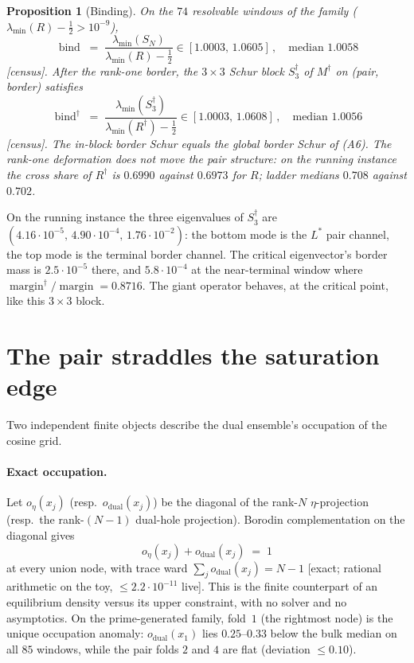 \documentclass[11pt]{article}
\newtheorem{prop}{Proposition}
\theoremstyle{remark}
\newcommand{\Rd}{R^{\dagger}}
\newcommand{\Ls}{L^{*}}
\newcommand{\half}{\tfrac12}
\newcommand{\gr}[1]{\textnormal{\small[#1]}}
\begin{document}
\begin{prop}[Binding]\label{prop:block}
On the $74$ resolvable windows of the family
($\lambda_{\min}(R)-\half>10^{-9}$),
\[
\operatorname{bind}
\;=\;
\frac{\lambda_{\min}(S_{N})}{\lambda_{\min}(R)-\half}
\in[1.0003,\,1.0605]\,,
\quad\text{median }1.0058
\]
\gr{census}.  After the rank-one border, the $3\times3$ Schur block
$S^{\dagger}_{3}$ of $M^{\dagger}$ on (pair, border) satisfies
\[
\operatorname{bind}^{\dagger}
\;=\;
\frac{\lambda_{\min}(S^{\dagger}_{3})}{\lambda_{\min}(\Rd)-\half}
\in[1.0003,\,1.0608]\,,
\quad\text{median }1.0056
\]
\gr{census}.  The in-block border Schur equals the global border
Schur of \textup{(A6)}.  The rank-one deformation does not move the
pair structure: on the running instance the cross share of $\Rd$ is
$0.6990$ against $0.6973$ for $R$; ladder medians $0.708$ against
$0.702$.
\end{prop}

On the running instance the three eigenvalues of $S^{\dagger}_{3}$ are
$(4.16\cdot10^{-5},\,4.90\cdot10^{-4},\,1.76\cdot10^{-2})$: the bottom
mode is the $\Ls$ pair channel, the top mode is the terminal border
channel.  The critical eigenvector's border mass is
$2.5\cdot10^{-5}$ there, and $5.8\cdot10^{-4}$ at the
near-terminal window where
$\operatorname{margin}^{\dagger}/\operatorname{margin}=0.8716$.
The giant operator behaves, at the critical point, like this
$3\times3$ block.

\section{The pair straddles the saturation edge}\label{sec:edge}

Two independent finite objects describe the dual ensemble's occupation
of the cosine grid.

\paragraph{Exact occupation.}
Let $o_{\eta}(x_{j})$ (resp.\ $o_{\mathrm{dual}}(x_{j})$) be the
diagonal of the rank-$N$ $\eta$-projection (resp.\ the rank-$(N-1)$
dual-hole projection).  Borodin complementation on the diagonal gives
\begin{equation}\label{eq:occ}
o_{\eta}(x_{j})+o_{\mathrm{dual}}(x_{j})\;=\;1
\end{equation}
at every union node, with trace ward
$\sum_{j}o_{\mathrm{dual}}(x_{j})=N-1$
\gr{exact; rational arithmetic on the toy, $\le 2.2\cdot10^{-11}$
live}.  This is the finite counterpart of an equilibrium density
versus its upper constraint, with no solver and no asymptotics.  On
the prime-generated family, fold~$1$ (the rightmost node) is the
unique occupation anomaly: $o_{\mathrm{dual}}(x_{1})$ lies
$0.25$--$0.33$ below the bulk median on all $85$ windows, while the
pair folds $2$ and $4$ are flat (deviation $\le 0.10$).
\end{document}
